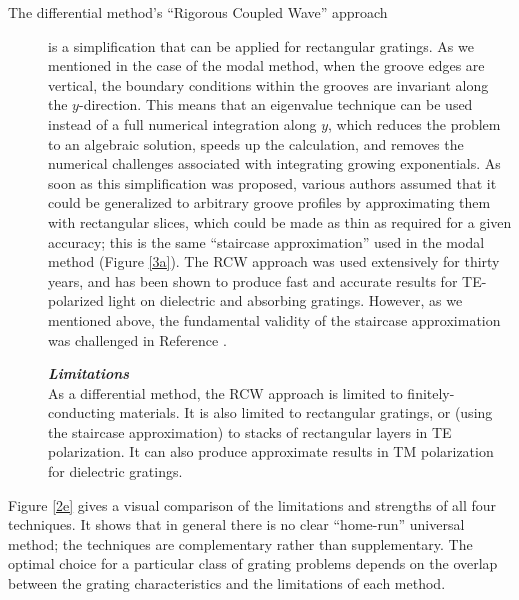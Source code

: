 \begin{description}
\item[The differential method's ``Rigorous Coupled Wave'' approach] is a simplification that can be applied for rectangular gratings.  As we mentioned in the case of the modal method, when the groove edges are vertical, the boundary conditions within the grooves are invariant along the $y$-direction.  This means that an eigenvalue technique can be used instead of a full numerical integration along $y$, which reduces the problem to an algebraic solution, speeds up the calculation, and removes the numerical challenges associated with integrating growing exponentials.  As soon as this simplification was proposed, various authors \cite{Bur66,Pen75,Moh81} assumed that it could be generalized to arbitrary groove profiles by approximating them with rectangular slices, which could be made as thin as required for a given accuracy; this is the same ``staircase approximation'' used in the modal method (Figure \ref{3a}).  The RCW approach was used extensively for thirty years, and has been shown to produce fast and accurate results for TE-polarized light on dielectric and absorbing gratings.  However, as we mentioned above, the fundamental validity of the staircase approximation was challenged in Reference \cite{Pop02}.
 
\noindent\textbf{\emph{Limitations}}\\
As a differential method, the RCW approach is limited to finitely-conducting materials.  It is also limited to rectangular gratings, or (using the staircase approximation) to stacks of rectangular layers in TE polarization.  It can also produce approximate results in TM polarization for dielectric gratings.
\end{description}
 
Figure \ref{2e} gives a visual comparison of the limitations and strengths of all four techniques.  It shows that in general there is no clear ``home-run'' universal method; the techniques are complementary rather than supplementary.  The optimal choice for a particular class of grating problems depends on the overlap between the grating characteristics and the limitations of each method.
 
